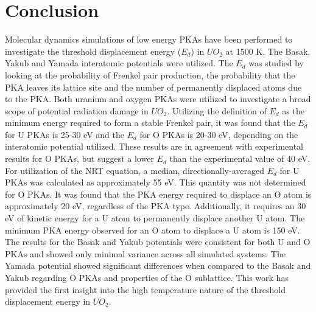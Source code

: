 \documentclass[8pt]{article}   	%
\begin{document}
\section{Conclusion}
\hspace{5mm}

Molecular dynamics simulations of low energy PKAs have been performed to investigate the threshold displacement energy ($E_d$) in $UO_2$ at 1500 K. The Basak, Yakub and Yamada interatomic potentials were utilized. The $E_d$ was studied by looking at the probability of Frenkel pair production, the probability that the PKA leaves its lattice site and the number of permanently displaced atoms due to the PKA. Both uranium and oxygen PKAs were utilized to investigate a broad scope of potential radiation damage in $UO_2$. Utilizing the definition of $E_d$ as the minimum energy required to form a stable Frenkel pair, it was found that the $E_d$ for U PKAs is 25-30 eV and the $E_d$ for O PKAs is 20-30 eV, depending on the interatomic potential utilized. These results are in agreement with experimental results for O PKAs, but suggest a lower $E_d$ than the experimental value of 40 eV. For utilization of the NRT equation, a median, directionally-averaged $E_d$ for U PKAs was calculated as approximately 55 eV. This quantity was not determined for O PKAs. It was found that the PKA energy required to displace an O atom is approximately 20 eV, regardless of the PKA type. Additionally, it requires an 30 eV of kinetic energy for a U atom to permanently displace another U atom. The minimum PKA energy observed for an O atom to displace a U atom is 150 eV. The results for the Basak and Yakub potentials were consistent for both U and O PKAs and showed only minimal variance across all simulated systems. The Yamada potential showed significant differences when compared to the Basak and Yakub regarding O PKAs and properties of the O sublattice. This work has provided the first insight into the high temperature nature of the threshold displacement energy in $UO_2$. 




\end{document}
